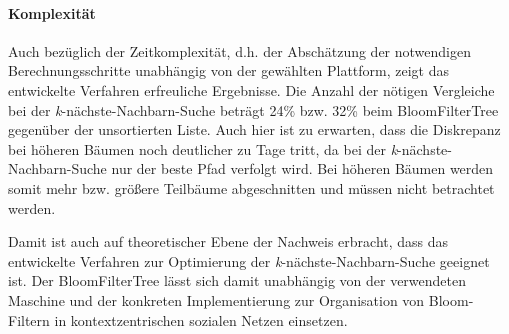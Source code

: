 \paragraph*{Komplexität}
Auch bezüglich der Zeitkomplexität, d.h. der Abschätzung der notwendigen Berechnungsschritte unabhängig von der gewählten Plattform, zeigt das entwickelte Verfahren erfreuliche Ergebnisse. Die Anzahl der nötigen Vergleiche bei der \textit{k}-nächste-Nachbarn-Suche beträgt 24\% bzw. 32\% beim BloomFilterTree gegenüber der unsortierten Liste. Auch hier ist zu erwarten, dass die Diskrepanz bei höheren Bäumen noch deutlicher zu Tage tritt, da bei der \textit{k}-nächste-Nachbarn-Suche nur der beste Pfad verfolgt wird. Bei höheren Bäumen werden somit mehr bzw. größere Teilbäume abgeschnitten und müssen nicht betrachtet werden.

Damit ist auch auf theoretischer Ebene der Nachweis erbracht, dass das entwickelte Verfahren zur Optimierung der \textit{k}-nächste-Nachbarn-Suche geeignet ist. Der BloomFilterTree lässt sich damit unabhängig von der verwendeten Maschine und der konkreten Implementierung zur Organisation von Bloom-Filtern in kontextzentrischen sozialen Netzen einsetzen. 